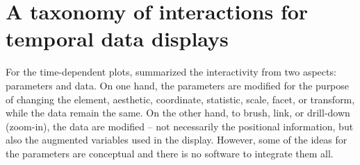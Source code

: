 \documentclass[12pt]{article}
\providecommand{\tabularnewline}{\\}
\begin{document}
\begin{enumerate}
% 

\end{enumerate}


\section{A taxonomy of interactions for temporal data displays\label{sec:Design-of-interactions}}

For the time-dependent plots, \citet{wills2012visualizing} summarized
the interactivity from two aspects: parameters and data. On one hand,
the parameters are modified for the purpose of changing the element,
aesthetic, coordinate, statistic, scale, facet, or transform, while
the data remain the same. On the other hand, to brush, link, or drill-down (zoom-in),
the data are modified -- not necessarily the positional information,
but also the augmented variables used in the display. However, some
of the ideas for the parameters are conceptual and there is no software
to integrate them all.
\end{document}
